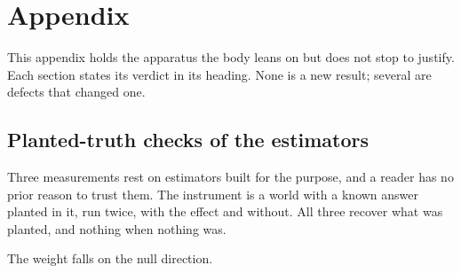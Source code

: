 %
%
%

\chapter{Appendix}
\label{sec:appendix}

\noindent
This appendix holds the apparatus the body leans on but does not stop to
justify. Each section states its verdict in its heading. None is a new result;
several are defects that changed one.

\section{Planted-truth checks of the estimators}
\label{sec:app-planted}

\begin{question}
Three measurements rest on estimators built for the purpose, and a reader has no
prior reason to trust them. The instrument is a world with a known answer
planted in it, run twice, with the effect and without. All three recover what
was planted, and nothing when nothing was.
\end{question}

\noindent
The weight falls on the null direction.

